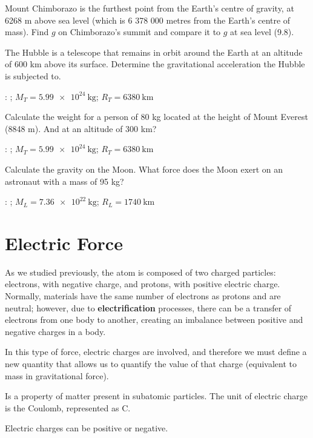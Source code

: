 \begin{exercise}
    Mount Chimborazo is the furthest point from the Earth’s centre of gravity, at 6268 m above sea level (which is 6 378 000 metres from the Earth’s centre of mass).
    Find \( g \) on Chimborazo’s summit and compare it to \( g \) at sea level (\qty{9.8}{\mpss}).
\end{exercise}

\begin{exercise}
    The Hubble is a telescope that remains in orbit around the Earth at an altitude of 600 km above its surface.
    Determine the gravitational acceleration the Hubble is subjected to.

    \datos{}: \Ggravitacion; \( M_T = \qty{5.99e24}{\kilo\g} \); \( R_T = \qty{6380}{\kilo\metre} \)
\end{exercise}


\begin{exercise}
    Calculate the weight for a person of 80 kg located at the height of Mount Everest (8848 m).
    And at an altitude of 300 km?

    \datos{}: \Ggravitacion; \( M_T = \qty{5.99e24}{\kilo\g} \); \( R_T = \qty{6380}{\kilo\metre} \)
\end{exercise}


\begin{exercise}
    Calculate the gravity on the Moon. What force does the Moon exert on an astronaut with a mass of 95 kg?

    \datos{}: \Ggravitacion; \( M_L = \qty{7.36e22}{\kilo\g} \); \( R_L = \qty{1740}{\kilo\metre} \)
\end{exercise}


\section{Electric Force}

As we studied previously, the atom is composed of two charged particles: electrons, with negative charge, and protons, with positive electric charge.
Normally, materials have the same number of electrons as protons and are neutral; however, due to \textbf{electrification} processes, there can be a transfer of electrons from one body to another, creating an imbalance between positive and negative charges in a body.

In this type of force, electric charges are involved, and therefore we must define a new quantity that allows us to quantify the value of that charge (equivalent to mass in gravitational force).
\begin{definition}
    Is a property of matter present in subatomic particles.
    The unit of electric charge is the Coulomb, represented as \( \unit{\coulomb} \).

    Electric charges can be positive or negative.
\end{definition}

